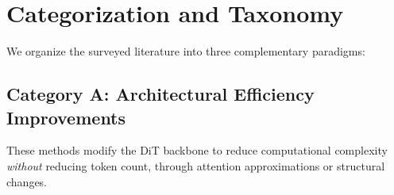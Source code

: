 \documentclass{article}
\begin{document}

\section{Categorization and Taxonomy}

We organize the surveyed literature into three complementary paradigms:

\subsection{Category A: Architectural Efficiency Improvements}
These methods modify the DiT backbone to reduce computational complexity
\textit{without} reducing token count, through attention approximations or
structural changes.
\end{document}

